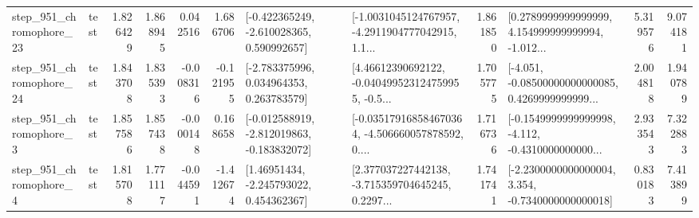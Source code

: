 \begin{tabular}{llrrrrllrlrr}
  step\_951\_chromophore\_23 &      test &      1.826429 &    1.868945 &      0.042516 &  1.686706 &   [-0.422365249, -2.610028365, 0.590992657] &  [-1.0031045124767957, -4.2911904777042915, 1.1... &       1.861850 &  [0.2789999999999999, 4.154999999999994, -1.012... &            5.319576 &          9.074181 \\
  step\_951\_chromophore\_24 &      test &      1.843708 &    1.835393 &     -0.008316 & -0.121955 &    [-2.783375996, 0.034964353, 0.263783579] &  [4.46612390692122, -0.040499523124759955, -0.5... &       1.705775 &  [-4.051, -0.08500000000000085, 0.4269999999999... &            2.004818 &          1.940789 \\
   step\_951\_chromophore\_3 &      test &      1.857586 &    1.857438 &     -0.000148 &  0.168658 &  [-0.012588919, -2.812019863, -0.183832072] &  [-0.035179168584670364, -4.506660057878592, 0.... &       1.716736 &  [-0.1549999999999998, -4.112, -0.4310000000000... &            2.933543 &          7.322883 \\
   step\_951\_chromophore\_4 &      test &      1.815708 &    1.771117 &     -0.044591 & -1.412674 &     [1.46951434, -2.245793022, 0.454362367] &  [2.377037227442138, -3.715359704645245, 0.2297... &       1.741741 &  [-2.2300000000000004, 3.354, -0.7340000000000018] &            0.830183 &          7.413899 \\
\bottomrule
\end{tabular}


